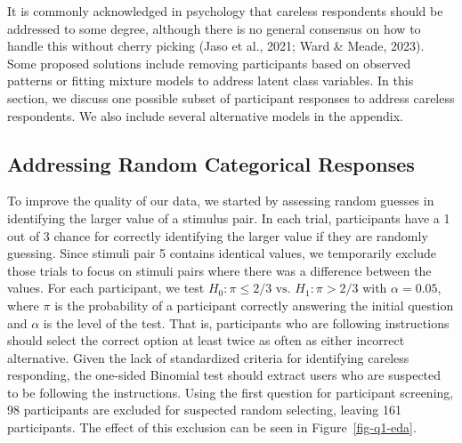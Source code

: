\documentclass[phd]{nuthesis}
\begin{document}
It is commonly acknowledged in psychology that careless respondents
should be addressed to some degree, although there is no general
consensus on how to handle this without cherry picking (Jaso et al.,
2021; Ward \& Meade, 2023). Some proposed solutions include removing
participants based on observed patterns or fitting mixture models to
address latent class variables. In this section, we discuss one possible
subset of participant responses to address careless respondents. We also
include several alternative models in the appendix.

\subsection{Addressing Random Categorical
Responses}\label{sec-remove-random-categories}

To improve the quality of our data, we started by assessing random
guesses in identifying the larger value of a stimulus pair. In each
trial, participants have a 1 out of 3 chance for correctly identifying
the larger value if they are randomly guessing. Since stimuli pair 5
contains identical values, we temporarily exclude those trials to focus
on stimuli pairs where there was a difference between the values. For
each participant, we test \(H_0: \pi\leq2/3\text{ vs. }H_1:\pi>2/3\)
with \(\alpha=0.05\), where \(\pi\) is the probability of a participant
correctly answering the initial question and \(\alpha\) is the level of
the test. That is, participants who are following instructions should
select the correct option at least twice as often as either incorrect
alternative. Given the lack of standardized criteria for identifying
careless responding, the one-sided Binomial test should extract users
who are suspected to be following the instructions. Using the first
question for participant screening, 98 participants are excluded for
suspected random selecting, leaving 161 participants. The effect of this
exclusion can be seen in Figure~\ref{fig-q1-eda}.
\end{document}
